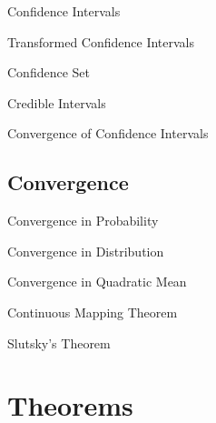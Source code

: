 \documentclass[11pt,a4paper]{article}
\begin{document}
\begin{definition}{Confidence Intervals}

\end{definition}

\begin{remark}{Transformed Confidence Intervals}
\end{remark}

\begin{definition}{Confidence Set}

\end{definition}

\begin{definition}{Credible Intervals}

\end{definition}

\begin{theorem}{Convergence of Confidence Intervals}

\end{theorem}

\subsection{Convergence}

\begin{definition}{Convergence in Probability}

\end{definition}

\begin{definition}{Convergence in Distribution}

\end{definition}

\begin{definition}{Convergence in Quadratic Mean}

\end{definition}

\begin{theorem}{Continuous Mapping Theorem}

\end{theorem}

\begin{theorem}{Slutsky's Theorem}

\end{theorem}

\section{Theorems}
\end{document}
